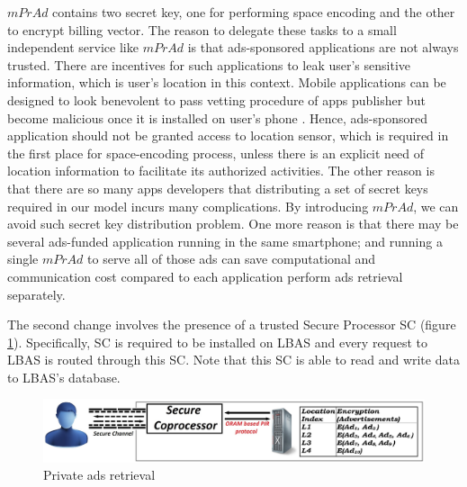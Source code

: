 $mPrAd$ contains two secret key, one for performing space encoding and the other to encrypt billing vector. The reason to delegate these tasks to a small independent service like $mPrAd$ is that ads-sponsored applications are not always trusted. There are incentives for such applications to leak user's sensitive information, which is user's location in this context. Mobile applications can be designed to look benevolent to pass vetting procedure of apps publisher but become malicious once it is installed on user's phone \cite{jekyll}. Hence, ads-sponsored application should not be granted access to location sensor, which is required in the first place for space-encoding process, unless there is an explicit need of location information to facilitate its authorized activities. The other reason is that there are so many apps developers that distributing a set of secret keys required in our model incurs many complications. By introducing $mPrAd$, we can avoid such secret key distribution problem. One more reason is that there may be several ads-funded application running in the same smartphone; and running a single $mPrAd$ to serve all of those ads can save computational and communication cost compared to each application perform ads retrieval separately. 


The second change involves the presence of a trusted Secure Processor SC (figure \ref{fig:architecture}). Specifically, SC is required to be installed on LBAS and every request to LBAS is routed through this SC. Note that this SC is able to read and write data to LBAS's database.


\begin{figure}[placement specifier]
\includegraphics[scale=0.22]{figures/architecture_img.jpg}
\caption{Private ads retrieval}
\label{fig:architecture}
\end{figure}





